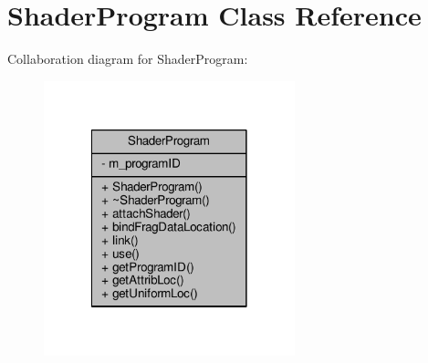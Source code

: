 \hypertarget{class_shader_program}{\section{Shader\-Program Class Reference}
\label{class_shader_program}
}


Collaboration diagram for Shader\-Program\-:
\nopagebreak
\begin{figure}[H]
\begin{center}
\leavevmode
\includegraphics[width=206pt]{class_shader_program__coll__graph}
\end{center}
\end{figure}
